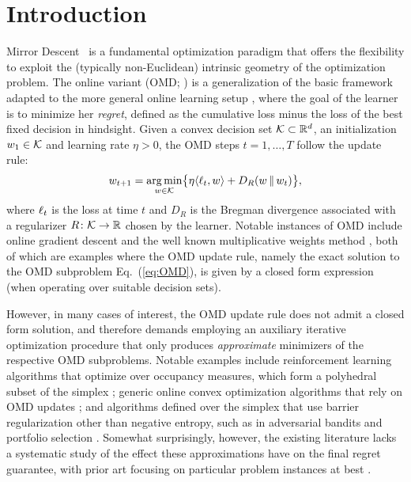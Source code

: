 \documentclass[10pt]{article}
\newif\ifopt
\newcommand{\opt}[1]{\ifopt #1\fi}
\let\cite\citep
\theoremstyle{definition}
\theoremstyle{remark}
\newcommand{\R}{\mathbb{R}}
\begin{document}
\section{Introduction}
Mirror Descent~\citep{nemirovsky1983problem,beck2003mirror} is a fundamental optimization paradigm that offers the flexibility to exploit the (typically non-Euclidean) intrinsic geometry of the optimization problem. 
The online variant (OMD; \citealp{shalev2012online,hazan2016introduction}) is a generalization of the basic framework adapted to the more general online learning setup \cite{zinkevich2003online}, where the goal of the learner is to minimize her \emph{regret}, defined as the cumulative loss minus the loss of the best fixed decision in hindsight.
%
%
%
Given a convex decision set $\cK\subset \R^d$, 
an initialization $w_1\in \mathcal K$ and learning rate $\eta > 0$, the OMD steps $t=1, \ldots, T$ follow the update rule:
\begin{align}\label{eq:OMD}
    w_{t+1} = \argmin_{w\in \cK} \bigl\{  \eta \langle \ell_t, w \rangle + D_R(w \,\|\, w_t) \bigr\} ,
\end{align} 
where $\ell_t$ is the loss at time $t$ and $D_R$ is the Bregman divergence associated with a regularizer \(R\colon \cK \to \R\) chosen by the learner.
%
Notable instances of OMD include online gradient descent \citep{zinkevich2003online} and the well known multiplicative weights method \citep{littlestone1994weighted, freund1997decision, arora2012multiplicative}, both of which are examples where the OMD update rule, namely the exact solution to the OMD subproblem Eq.~(\ref{eq:OMD}), is given by a closed form expression (when operating over suitable decision sets). 

However, in many cases of interest, the OMD update rule does not admit a closed form solution, and therefore demands employing an auxiliary iterative optimization procedure that only produces \emph{approximate} minimizers of the respective OMD subproblems.
Notable examples include reinforcement learning algorithms that optimize over occupancy measures, which form a polyhedral subset of the simplex \citep{NIPS2013_68053af2,pmlr-v97-rosenberg19a,pmlr-v119-jin20c}; 
generic online convex optimization algorithms that rely on OMD updates \citep{5044958,10.5555/2968826.2968914,pmlr-v108-ito20a}; 
and algorithms defined over the simplex that use barrier regularization other than negative entropy, such as in adversarial bandits \citep{NIPS2015_5caf41d6,zimmert2021tsallis} and portfolio selection \citep{luo2018efficient}.  
Somewhat surprisingly, however, the existing literature lacks a systematic study of the effect these approximations have on the final regret guarantee, with prior art focusing on particular problem instances at best \cite{schmidt2011convergence, villa2013accelerated, dixit2019online,choi2023inexact}.
%
\opt{(Due to space constraints, discussion of additional related work is deferred to \Cref{sec:related work}.)}
\end{document}
